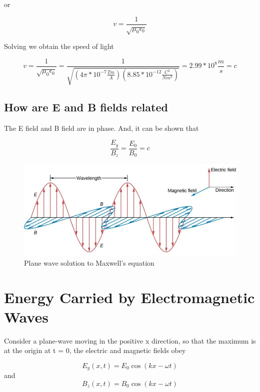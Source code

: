 \documentclass[14pt]{memoir}
\begin{document}
or

\begin{equation}
v = \frac{1}{\sqrt{\mu_0 \epsilon_0}}
\end{equation}

Solving we obtain the speed of light

\begin{equation}
v = \frac{1}{\sqrt{\mu_0 \epsilon_0}} = \frac{1}{\sqrt{(4 \pi * 10^{-7} \frac{T m}{A})(8.85*10^{-12} \frac{C^2}{N m^2})}} = 2.99 * 10^8 \frac{m}{s} = c
\end{equation}

\subsection{How are E and B fields related}

The E field and B field are in phase. And, it can be shown that 

\begin{equation}
\frac{E_y}{B_z} = \frac{E_0}{B_0} = c
\end{equation}

\begin{figure}[H]
\begin{center}
\includegraphics[scale=0.5]{fig/fig_16_08.jpg}
\caption{Plane wave solution to Maxwell's equation}
\label{fig:16_08}
\end{center}
\end{figure}

\section{Energy Carried by Electromagnetic Waves}

Consider a plane-wave moving in the positive x direction, so that the maximum is at the origin at t = 0, the electric and magnetic fields obey

\begin{equation}
E_y(x,t) = E_0 \cos{(kx-\omega t)}
\end{equation}
and
\begin{equation}
B_z(x,t) = B_0 \cos{(kx-\omega t)}
\end{equation}
\end{document}
